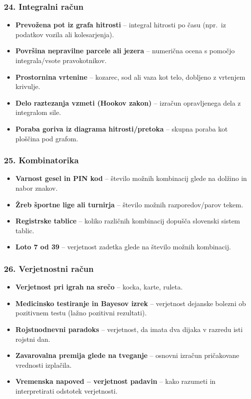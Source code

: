 \documentclass[11pt,a4paper]{article}
\begin{document}
\subsubsection*{24. Integralni račun}
\begin{itemize}
  \item \textbf{Prevožena pot iz grafa hitrosti} -- integral hitrosti po času (npr.\ iz podatkov vozila ali kolesarjenja).
  \item \textbf{Površina nepravilne parcele ali jezera} -- numerična ocena s pomočjo integrala/vsote pravokotnikov.
  \item \textbf{Prostornina vrtenine} -- kozarec, sod ali vaza kot telo, dobljeno z vrtenjem krivulje.
  \item \textbf{Delo raztezanja vzmeti (Hookov zakon)} -- izračun opravljenega dela z integralom sile.
  \item \textbf{Poraba goriva iz diagrama hitrosti/pretoka} -- skupna poraba kot ploščina pod grafom.
\end{itemize}

\subsubsection*{25. Kombinatorika}
\begin{itemize}
  \item \textbf{Varnost gesel in PIN kod} -- število možnih kombinacij glede na dolžino in nabor znakov.
  \item \textbf{Žreb športne lige ali turnirja} -- število možnih razporedov/parov tekem.
  \item \textbf{Registrske tablice} -- koliko različnih kombinacij dopušča slovenski sistem tablic.
  \item \textbf{Loto 7 od 39} -- verjetnost zadetka glede na število možnih kombinacij.
\end{itemize}

\subsubsection*{26. Verjetnostni račun}
\begin{itemize}
  \item \textbf{Verjetnost pri igrah na srečo} -- kocka, karte, ruleta.
  \item \textbf{Medicinsko testiranje in Bayesov izrek} -- verjetnost dejanske bolezni ob pozitivnem testu (lažno pozitivni rezultati).
  \item \textbf{Rojstnodnevni paradoks} -- verjetnost, da imata dva dijaka v razredu isti rojstni dan.
  \item \textbf{Zavarovalna premija glede na tveganje} -- osnovni izračun pričakovane vrednosti izplačila.
  \item \textbf{Vremenska napoved -- verjetnost padavin} -- kako razumeti in interpretirati odstotek verjetnosti.
\end{itemize}
\end{document}
